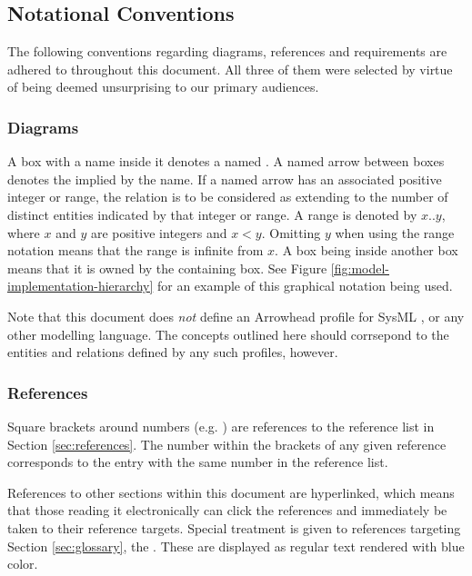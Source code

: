 \subsection{Notational Conventions}
\label{sec:introduction:conventions}

The following conventions regarding diagrams, references and requirements are adhered to throughout this document.
All three of them were selected by virtue of being deemed unsurprising to our primary audiences.

\subsubsection{Diagrams}

A box with a name inside it denotes a named .
A named arrow between boxes denotes the  implied by the name.
If a named arrow has an associated positive integer or range, the relation is to be considered as extending to the number of distinct entities indicated by that integer or range.
A range is denoted by $x..y$, where $x$ and $y$ are positive integers and $x<y$.
Omitting $y$ when using the range notation means that the range is infinite from $x$.
A box being inside another box means that it is owned by the containing box.
See Figure \ref{fig:model-implementation-hierarchy} for an example of this graphical notation being used.

Note that this document does \textit{not} define an Arrowhead profile for SysML \cite{omg2019sysml}, or any other modelling language.
The concepts outlined here should corrsepond to the entities and relations defined by any such profiles, however.

\subsubsection{References}

Square brackets around numbers (e.g. \cite{delsing2017iot}) are references to the reference list in Section \ref{sec:references}.
The number within the brackets of any given reference corresponds to the entry with the same number in the reference list.

References to other sections within this document are hyperlinked, which means that those reading it electronically can click the references and immediately be taken to their reference targets.
Special treatment is given to references targeting Section \ref{sec:glossary}, the .
These are displayed as regular text rendered with blue color.

